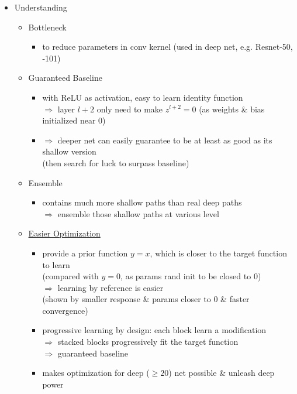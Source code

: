 \begin{itemize}
\item Understanding
	\begin{itemize}
	\item Bottleneck
		\begin{itemize}
		\item to reduce parameters in conv kernel (used in deep net, e.g. Resnet-50, -101)
		\end{itemize}
	\item Guaranteed Baseline
		\begin{itemize}
		\item with ReLU as activation, easy to learn identity function \\ 
		$\Rightarrow$ layer $l+2$ only need to make $z^{l+2}=0$ (as weights \& bias initialized near $0$)
		\item $\Rightarrow$ deeper net can easily guarantee to be at least as good as its shallow version \\
		(then search for luck to surpass baseline)
		\end{itemize}
	\item Ensemble
		\begin{itemize}
		\item contains much more shallow paths than real deep paths \\
		$\Rightarrow$ ensemble those shallow paths at various level
		\end{itemize}
	\item \underline{Easier Optimization}
		\begin{itemize}
		\item provide a prior function $y=x$, which is closer to the target function to learn \\
		(compared with $y=0$, as params rand init to be closed to $0$) \\
		$\Rightarrow$ learning by reference is easier \\
		(shown by smaller response \& params closer to $0$ \& faster convergence)
		\item progressive learning by design: each block learn a modification \\
		$\Rightarrow$ stacked blocks progressively fit the target function \\ 
		$\Rightarrow$ guaranteed baseline
		\item makes optimization for deep ($\ge 20$) net possible \& unleash deep power
		\end{itemize}
	\end{itemize}
\end{itemize}

